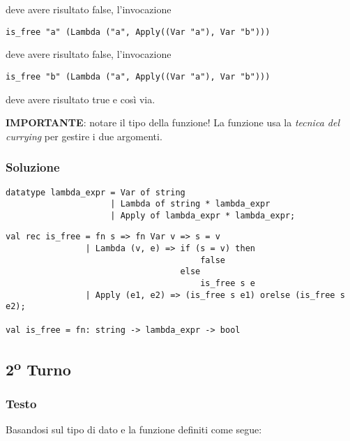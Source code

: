 deve avere risultato false, l'invocazione

\begin{lstlisting}
is_free "a" (Lambda ("a", Apply((Var "a"), Var "b")))
\end{lstlisting}

deve avere risultato false, l'invocazione

\begin{lstlisting}
is_free "b" (Lambda ("a", Apply((Var "a"), Var "b")))
\end{lstlisting}

deve avere risultato true e così via.

\medskip
\textbf{IMPORTANTE}: notare il tipo della funzione! La funzione usa la \emph{tecnica del currying} per gestire i due argomenti.

\subsubsection{Soluzione}

\begin{lstlisting}[style = SML, nolol = true, caption = {Definizione del tipo di dato \sml{espressione Lambda}}]
datatype lambda_expr = Var of string
					 | Lambda of string * lambda_expr
					 | Apply of lambda_expr * lambda_expr;
\end{lstlisting}

\begin{lstlisting}[style = SML, caption = {Definizione della funzione \sml{is\_free}}]
val rec is_free = fn s => fn Var v => s = v
				| Lambda (v, e) => if (s = v) then
									   false
								   else
									   is_free s e
				| Apply (e1, e2) => (is_free s e1) orelse (is_free s e2);

val is_free = fn: string -> lambda_expr -> bool
\end{lstlisting}

\subsection{2\textsuperscript{o} Turno}

\subsubsection{Testo}

Basandosi sul tipo di dato  e la funzione  definiti come segue:

